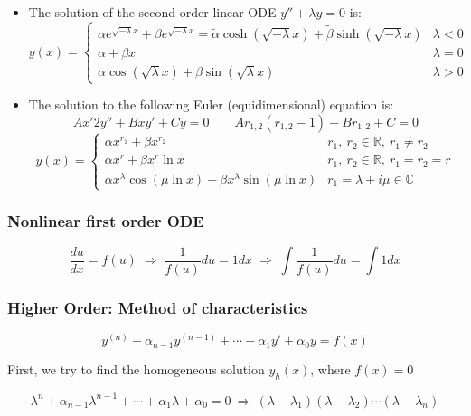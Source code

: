 \documentclass{article}
\begin{document}
\begin{twocolumn}
\begin{itemize}
\item The solution of the second order linear ODE $y'' + \lambda y = 0$ is:
$$y(x) = \begin{cases} \alpha e^{\sqrt{-\lambda} x} + \beta e^{\sqrt{-\lambda} x} = \tilde \alpha \cosh \left( \sqrt{-\lambda} x \right) +\tilde \beta \sinh \left( \sqrt{-\lambda} x \right) & \lambda < 0\\
\alpha + \beta x & \lambda = 0 \\ \alpha \cos \left( \sqrt{\lambda} x \right) + \beta \sin \left( \sqrt{\lambda} x \right) & \lambda > 0 \end{cases}$$

\item The solution to the following Euler (equidimensional) equation is:
$$A x'2 y'' + B x y' + C y = 0 \qquad A r_{1,2}(r_{1,2}-1) + B r_{1,2} + C = 0$$
$$y(x) = \begin{cases}
\alpha x^{r_1} + \beta x^{r_2} & r_1, \ r_2 \in \mathbb{R},\  r_1 \neq r_2 \\
\alpha x^r + \beta x^r \ln x & r_1, \ r_2 \in \mathbb{R}, \ r_1 = r_2 = r \\
\alpha x^\lambda \cos \left( \mu \ln x \right) +\beta x^\lambda \sin \left( \mu \ln x \right) & r_1 = \lambda + i \mu \in \mathbb{C}
\end{cases}$$

\end{itemize}

\subsubsection{Nonlinear first order ODE}

$$\frac{du}{dx} = f(u) \;\Rightarrow\; \frac{1}{f(u)} du = 1 dx \;\Rightarrow\; \int \frac{1}{f(u)} du = \int 1 dx $$

\subsubsection{Higher Order: Method of characteristics}

$$y^{(n)} + \alpha_{n-1} y^{(n-1)} + \cdots +  \alpha_1 y' + \alpha_0 y = f(x)$$

First, we try to find the homogeneous solution $y_h(x)$, where $f(x) = 0$

$$\lambda^n + \alpha_{n-1} \lambda^{n-1} + \cdots + \alpha_1 \lambda + \alpha_0 = 0 \ \Rightarrow \ (\lambda - \lambda_1) (\lambda - \lambda_2) \cdots (\lambda - \lambda_n)$$


\end{twocolumn}
\end{document}
